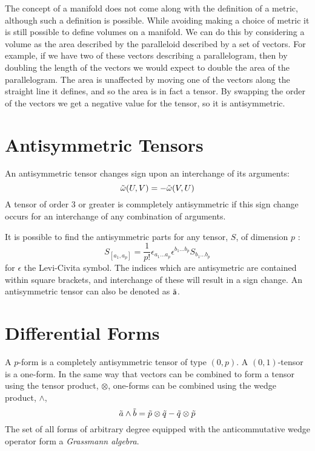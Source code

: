 The concept of a manifold does not come along with the definition of a
metric, although such a definition is possible. While avoiding making
a choice of metric it is still possible to define volumes on a
manifold. We can do this by considering a volume as the area described
by the paralleloid described by a set of vectors. For example, if we
have two of these vectors describing a parallelogram, then by doubling
the length of the vectors we would expect to double the area of the
parallelogram. The area is unaffected by moving one of the vectors
along the straight line it defines, and so the area is in fact a
tensor. By swapping the order of the vectors we get a negative value
for the tensor, so it is antisymmetric.

\section{Antisymmetric Tensors}
\label{sec:antisymm-tens}

An antisymmetric tensor changes sign upon an interchange of its arguments:
\[ \tilde{\omega}(U,V) = - \tilde{\omega}(V,U) \] A tensor of order 3 or
greater is commpletely antisymmetric if this sign change occurs for an
interchange of any combination of arguments.

It is possible to find the antisymmetric parts for any tensor, $S$, of
dimension $p$ :
\begin{equation}
  \label{eq:33}
  S_{[a_1 ,a_p]} = \frac{1}{p!} \epsilon_{a_1 \dots a_p}\epsilon^{b_1 \dots b_p} S_{b_1\dots b_p}
\end{equation}
for $\epsilon$ the Levi-Civita symbol. The indices which are
antisymetric are contained within square brackets, and interchange of
these will result in a sign change. An antisymmetric tensor can also
be denoted as \newcommand{\aten}[1]{\of{\ten{#1}}} $\aten{a}$.

\section{Differential Forms}
\label{sec:differential-forms}

A $p$-form is a completely antisymmetric tensor of type $(0,p)$. A
$(0,1)$-tensor is a one-form.  In the same way that vectors can be
combined to form a tensor using the tensor product, $\otimes$,
one-forms can be combined using the wedge product, $\wedge$,
\begin{equation}
  \label{eq:34}
  \tilde{a} \wedge \tilde{b} = \tilde{p} \otimes \tilde{q} - \tilde{q} \otimes \tilde{p}
\end{equation}
The set of all forms of arbitrary degree equipped with the
anticommutative wedge operator form a \emph{Grassmann algebra}.

